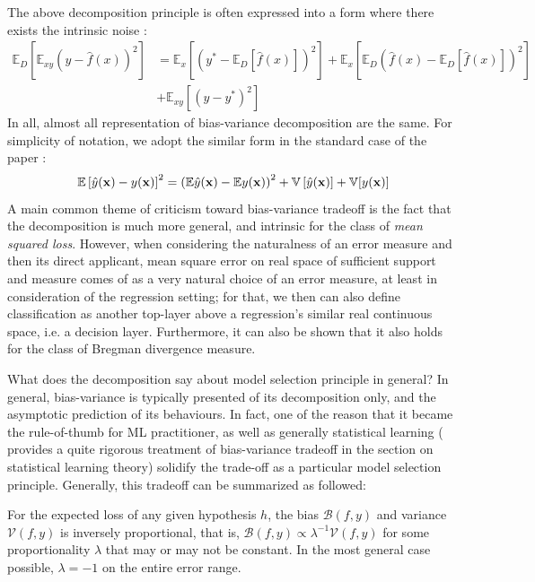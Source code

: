 \documentclass[10pt]{article} %
\begin{document}
The above decomposition principle is often expressed into a form where there exists the intrinsic noise \cite{brown2024biasvariance}: 
\begin{equation}
    \begin{split}
        \mathbb{E}_D \left[ \mathbb{E}_{xy} \left( y - \hat{f}(x) \right)^2 \right]
        &= 
         \mathbb{E}_x \left[ \left( y^* - \mathbb{E}_D[\hat{f}(x)] \right)^2 \right]
        + \mathbb{E}_x \left[ \mathbb{E}_D \left( \hat{f}(x) - \mathbb{E}_D[\hat{f}(x)] \right)^2 \right] \\
        &+ \mathbb{E}_{xy} \left[ \left( y - y^* \right)^2 \right]
    \end{split}
    \end{equation}
In all, almost all representation of bias-variance decomposition are the same. For simplicity of notation, we adopt the similar form in the standard case of the paper \cite{adlam2020understandingdoubledescentrequires}: 
\begin{equation}
    \mathbb{E} \left[{\hat{y}(\mathbf{x})-y(\mathbf{x})}\right]^2 = \left({\mathbb{E}\hat{y}(\mathbf{x}) - \mathbb{E} y(\mathbf{x})}\right)^2 + \mathbb{V}\left[{\hat{y}(\mathbf{x})}\right] + \mathbb{V}[{y(\mathbf{x})}]
\end{equation}
A main common theme of criticism toward bias-variance tradeoff is the fact that the decomposition is much more general, and intrinsic for the class of \textit{mean squared loss}. However, when considering the naturalness of an error measure and then its direct applicant, mean square error on real space of sufficient support and measure comes of as a very natural choice of an error measure, at least in consideration of the regression setting; for that, we then can also define classification as another top-layer above a regression's similar real continuous space, i.e. a decision layer. Furthermore, it can also be shown \cite{brown2024biasvariance,PfauBregmanDivergence} that it also holds for the class of Bregman divergence measure. 

What does the decomposition say about model selection principle in general? In general, bias-variance is typically presented of its decomposition only, and the asymptotic prediction of its behaviours. In fact, one of the reason that it became the rule-of-thumb for ML practitioner, as well as generally statistical learning (\cite{lafon_understanding_2024} provides a quite rigorous treatment of bias-variance tradeoff in the section on statistical learning theory) solidify the trade-off as a particular model selection principle. Generally, this tradeoff can be summarized as followed: 
\begin{theorem}\label{thm:bias-variance}
    For the expected loss of any given hypothesis $h$, the bias $\mathcal{B}(f,y)$ and variance $\mathcal{V}(f,y)$ is inversely proportional, that is, $\mathcal{B}(f,y)\propto \lambda^{-1} \mathcal{V}(f,y)$ for some proportionality $\lambda$ that may or may not be constant. In the most general case possible, $\lambda = -1$ on the entire error range. 
\end{theorem}
\end{document}
